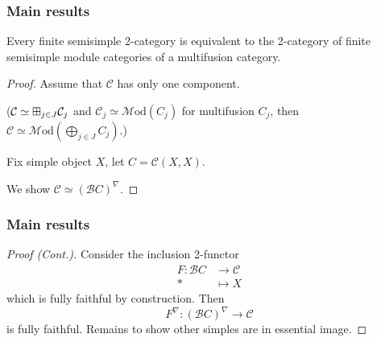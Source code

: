 \documentclass{beamer}
\DeclareMathOperator{\id}{id}
\newcommand{\cB}{{\mathcal{B}}}
\newcommand{\cC}{{\mathcal{C}}}
\newcommand{\bigboxplus}{\Huge \boxplus}
\newcommand{\Mod}{{\mathcal{M}\textrm{od}}}
\newcommand{\ModA}[1]{{\Mod(#1)}}
\begin{document}
\begin{frame}
\frametitle{Main results}

\begin{theorem}
Every finite semisimple 2-category is equivalent to
the 2-category of finite semisimple module categories
of a multifusion category.
\end{theorem}

\begin{proof}\renewcommand{\qedsymbol}{}
Assume that $\cC$ has only one component.

\pause
($\cC \simeq \bigboxplus_{j \in J} \cC_j$
and $\cC_j \simeq \ModA{C_j}$ for multifusion $C_j$,
then $\cC \simeq \ModA{\bigoplus_{j \in J} C_j}$.)

\pause
Fix simple object $X$, let $C = \cC(X,X)$.
\pause

We show $\cC \simeq (\cB C)^\nabla$.

\end{proof}

\end{frame}

\begin{frame}
\frametitle{Main results}

\begin{proof}[Proof (Cont.)]\renewcommand{\qedsymbol}{}

Consider the inclusion 2-functor
\begin{align*}
F : \cB C &\to \cC
\\
* &\mapsto X
\end{align*}
which is fully faithful by construction.
\pause
Then
\[
F^\nabla: (\cB C)^\nabla \to \cC
\]
is fully faithful.
\pause
Remains to show other simples are in essential image.

\end{proof}

\end{frame}
\end{document}

